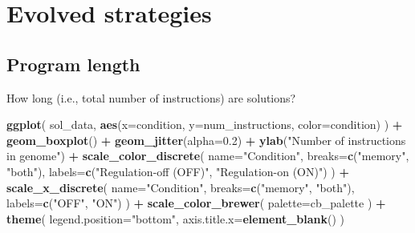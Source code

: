 \documentclass[]{book}
\newenvironment{Shaded}{\begin{snugshade}}{\end{snugshade}}
\newcommand{\DataTypeTok}[1]{\textcolor[rgb]{0.13,0.29,0.53}{#1}}
\newcommand{\FloatTok}[1]{\textcolor[rgb]{0.00,0.00,0.81}{#1}}
\newcommand{\KeywordTok}[1]{\textcolor[rgb]{0.13,0.29,0.53}{\textbf{#1}}}
\newcommand{\NormalTok}[1]{#1}
\newcommand{\OperatorTok}[1]{\textcolor[rgb]{0.81,0.36,0.00}{\textbf{#1}}}
\newcommand{\StringTok}[1]{\textcolor[rgb]{0.31,0.60,0.02}{#1}}
\begin{document}
\hypertarget{evolved-strategies-2}{%
\section{Evolved strategies}\label{evolved-strategies-2}}

\hypertarget{program-length-3}{%
\subsection{Program length}\label{program-length-3}}

How long (i.e., total number of instructions) are solutions?

\begin{Shaded}
\begin{Highlighting}[]
\KeywordTok{ggplot}\NormalTok{( sol_data, }\KeywordTok{aes}\NormalTok{(}\DataTypeTok{x=}\NormalTok{condition, }\DataTypeTok{y=}\NormalTok{num_instructions, }\DataTypeTok{color=}\NormalTok{condition) ) }\OperatorTok{+}
\StringTok{  }\KeywordTok{geom_boxplot}\NormalTok{() }\OperatorTok{+}
\StringTok{  }\KeywordTok{geom_jitter}\NormalTok{(}\DataTypeTok{alpha=}\FloatTok{0.2}\NormalTok{) }\OperatorTok{+}
\StringTok{  }\KeywordTok{ylab}\NormalTok{(}\StringTok{"Number of instructions in genome"}\NormalTok{) }\OperatorTok{+}
\StringTok{  }\KeywordTok{scale_color_discrete}\NormalTok{(}
    \DataTypeTok{name=}\StringTok{"Condition"}\NormalTok{,}
    \DataTypeTok{breaks=}\KeywordTok{c}\NormalTok{(}\StringTok{"memory"}\NormalTok{, }\StringTok{"both"}\NormalTok{),}
    \DataTypeTok{labels=}\KeywordTok{c}\NormalTok{(}\StringTok{"Regulation-off (OFF)"}\NormalTok{, }\StringTok{"Regulation-on (ON)"}\NormalTok{)}
\NormalTok{  ) }\OperatorTok{+}
\StringTok{  }\KeywordTok{scale_x_discrete}\NormalTok{(}
    \DataTypeTok{name=}\StringTok{"Condition"}\NormalTok{,}
    \DataTypeTok{breaks=}\KeywordTok{c}\NormalTok{(}\StringTok{"memory"}\NormalTok{, }\StringTok{"both"}\NormalTok{),}
    \DataTypeTok{labels=}\KeywordTok{c}\NormalTok{(}\StringTok{"OFF"}\NormalTok{, }\StringTok{"ON"}\NormalTok{)}
\NormalTok{  ) }\OperatorTok{+}
\StringTok{  }\KeywordTok{scale_color_brewer}\NormalTok{(}
    \DataTypeTok{palette=}\NormalTok{cb_palette}
\NormalTok{  ) }\OperatorTok{+}
\StringTok{  }\KeywordTok{theme}\NormalTok{(}
    \DataTypeTok{legend.position=}\StringTok{"bottom"}\NormalTok{,}
    \DataTypeTok{axis.title.x=}\KeywordTok{element_blank}\NormalTok{()}
\NormalTok{  )}
\end{Highlighting}
\end{Shaded}
\end{document}
